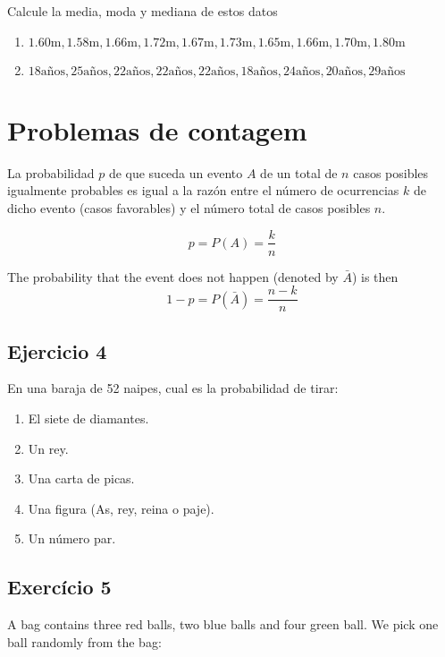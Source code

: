 Calcule la media, moda y mediana de estos datos

\begin{enumerate}
\item $1.60\text{m}, 1.58\text{m}, 1.66\text{m}, 1.72\text{m}, 1.67\text{m}, 1.73\text{m}, 1.65\text{m}, 1.66\text{m}, 1.70\text{m}, 1.80\text{m}$
\item $18 \text{años}, 25 \text{años}, 22 \text{años},  \text{22} \text{años},
   \text{22} \text{años},  \text{18} \text{años},
   \text{24} \text{años},  \text{20} \text{años},  \text{29} \text{años}$
\end{enumerate}

\section*{Problemas de contagem}

La probabilidad $p$ de que suceda un evento $A$ de un total de $n$ casos
posibles igualmente probables es igual a la razón entre el número de
ocurrencias $k$ de dicho evento (casos favorables) y el número total de casos
posibles $n$.

$$
p=P\left(A\right)=\frac {k}{n}
$$

The probability that the event does not happen (denoted by $\bar{A}$) is then
$$
1-p=P\left(\bar{A}\right)= \frac {n - k}{n}
$$

\subsection*{Ejercicio 4}

En una baraja de 52 naipes, cual es la probabilidad de tirar:

\begin{enumerate}
\item El siete de diamantes.
\item Un rey.
\item Una carta de picas.
\item Una figura (As, rey, reina o paje).
\item Un número par.
\end{enumerate}

\subsection*{Exercício 5}

A bag contains three red balls, two blue balls and four green ball. We pick
one ball randomly from the bag:

